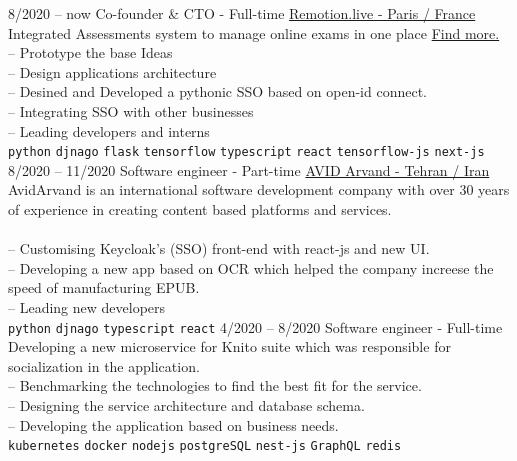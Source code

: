 \documentclass[9pt]{developercv}
\begin{document}
\begin{entrylist}
	\entry
	{8/2020 -- now}
	{Co-founder \& CTO - Full-time}
	{\href{https://remotion.live/}{Remotion.live - Paris / France }}
	{Integrated Assessments system to manage online exams in one place
		\href{https://remotion.live/} {Find more.} \\
		-- Prototype the base Ideas  \\
		-- Design applications architecture \\
		-- Desined and Developed a pythonic SSO based on open-id connect. \\
		-- Integrating SSO with other businesses \\
		-- Leading developers and interns \\
		\texttt{python}\slashsep
		\texttt{djnago}\slashsep
		\texttt{flask}\slashsep
		\texttt{tensorflow}\slashsep
		\texttt{typescript}\slashsep
		\texttt{react}\slashsep
		\texttt{tensorflow-js}\slashsep
		\texttt{next-js}\slashsep
	}
	\entry
	{8/2020 -- 11/2020}
	{Software engineer - Part-time}
	{
		\href{https://www.linkedin.com/company/avid-technology-development/}{AVID Arvand - Tehran / Iran}}
	{
		AvidArvand is an international software development company with over 30 years of experience in creating content based platforms and services. \\ \\
		-- Customising Keycloak's (SSO) front-end with react-js and new UI. \\
		-- Developing a new app based on OCR which helped the company increese the speed of manufacturing EPUB. \\
		-- Leading new developers \\
		\texttt{python}\slashsep
		\texttt{djnago}\slashsep
		\texttt{typescript}\slashsep
		\texttt{react}\slashsep
	}
	\entry
	{4/2020 -- 8/2020}
	{Software engineer - Full-time}
	{}
	{
		Developing a new microservice for Knito suite which was responsible for socialization in the application.\\
		-- Benchmarking the technologies to find the best fit for the service. \\
		-- Designing the service architecture and database schema. \\
		-- Developing the application based on business needs. \\
		\texttt{kubernetes}\slashsep
		\texttt{docker}\slashsep
		\texttt{nodejs}\slashsep
		\texttt{postgreSQL}\slashsep
		\texttt{nest-js}\slashsep
		\texttt{GraphQL}\slashsep
		\texttt{redis}\slashsep
}
\end{entrylist}
\end{document}
